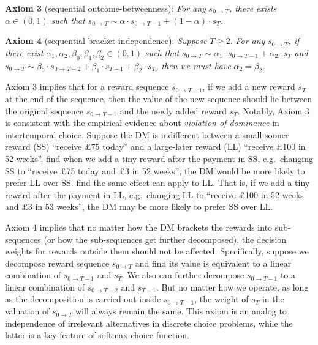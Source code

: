 \documentclass[
  12pt,
]{article}
\begin{document}
\noindent \textbf{Axiom 3} (sequential outcome-betweenness): \emph{For
any} \(s_{0\rightarrow T}\)\emph{, there exists} \(\alpha\in(0,1)\)
\emph{such that}
\(s_{0\rightarrow T} \sim \alpha\cdot s_{0\rightarrow T-1}+(1-\alpha) \cdot s_T\)\emph{.}

\noindent \textbf{Axiom 4} (sequential bracket-independence):
\emph{Suppose} \(T\geq 2\). \emph{For any} \(s_{0\rightarrow T}\)\emph{,
if there exist} \(\alpha_1,\alpha_2,\beta_0,\beta_1,\beta_2\in(0,1)\)
\emph{such that}
\(s_{0\rightarrow T}\sim \alpha_1 \cdot s_{0\rightarrow T-1} + \alpha_2 \cdot s_{T}\)
\emph{and}
\(s_{0\rightarrow T}\sim \beta_0 \cdot s_{0\rightarrow T-2}+\beta_1 \cdot s_{T-1}+\beta_2 \cdot s_{T}\)\emph{,
then we must have} \(\alpha_2 = \beta_2\)\emph{.}

Axiom 3 implies that for a reward sequence \(s_{0\rightarrow T-1}\), if
we add a new reward \(s_T\) at the end of the sequence, then the value
of the new sequence should lie between the original sequence
\(s_{0\rightarrow T-1}\) and the newly added reward \(s_T\). Notably,
Axiom 3 is consistent with the empirical evidence about \emph{violation
of dominance} \citep{scholten2014better, jiang2017better} in
intertemporal choice. Suppose the DM is indifferent between a
small-sooner reward (SS) ``receive £75 today'' and a large-later reward
(LL) ``receive £100 in 52 weeks''. \citet{scholten2014better} find when
we add a tiny reward after the payment in SS, e.g.~changing SS to
``receive £75 today and £3 in 52 weeks'', the DM would be more likely to
prefer LL over SS. \citet{jiang2017better} find the same effect can
apply to LL. That is, if we add a tiny reward after the payment in LL,
e.g.~changing LL to ``receive £100 in 52 weeks and £3 in 53 weeks'', the
DM may be more likely to prefer SS over LL.

Axiom 4 implies that no matter how the DM brackets the rewards into
sub-sequences (or how the sub-sequences get further decomposed), the
decision weights for rewards outside them should not be affected.
Specifically, suppose we decompose reward sequence
\(s_{0\rightarrow T}\) and find its value is equivalent to a linear
combination of \(s_{0\rightarrow T-1}\) and \(s_T\). We also can further
decompose \(s_{0\rightarrow T-1}\) to a linear combination of
\(s_{0\rightarrow T-2}\) and \(s_{T-1}\). But no matter how we operate,
as long as the decomposition is carried out inside
\(s_{0\rightarrow T-1}\), the weight of \(s_T\) in the valuation of
\(s_{0\rightarrow T}\) will always remain the same. This axiom is an
analog to independence of irrelevant alternatives in discrete choice
problems, while the latter is a key feature of softmax choice function.
\end{document}
